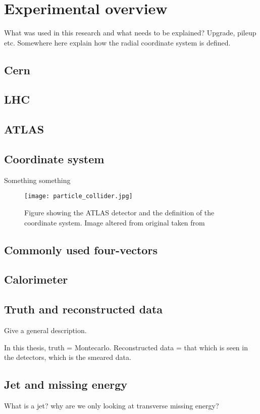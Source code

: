\newpage
\section{Experimental overview}
What was used in this research and what needs to be explained? Upgrade, pileup etc.
Somewhere here explain how the radial coordinate system is defined.
\subsection{Cern}
\subsection{LHC}
\subsection{ATLAS}
\subsection{Coordinate system}
Something something

\begin{figure}[H]
\begin{center}
\texttt{[image: particle\_collider.jpg]}
\label{fig:coordinatesystem}
\caption{Figure showing the ATLAS detector and the definition of the coordinate system. Image altered from original taken from\citep{coordimage}}
\end{center}
\end{figure}



\subsection{Commonly used four-vectors}
\subsection{Calorimeter}
\subsection{Truth and reconstructed data}
Give a general description.

In this thesis, truth = Montecarlo. 
Reconstructed data = that which is seen in the detectors, which is the smeared data.
\subsection{Jet and missing energy}
What is a jet? why are we only looking at transverse missing energy? 

